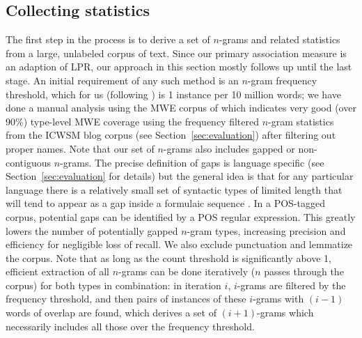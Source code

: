 \documentclass[11pt,letterpaper]{article}
\newcommand{\secref}[2][]{Section#1~\ref{#2}\xspace}
\begin{document}
\subsection{Collecting statistics}

The first step in the process is to derive a set of $n$-grams and related statistics from a large, unlabeled corpus of text. Since our primary association measure is an adaption of LPR, our approach in this section mostly follows  up until the last stage. An initial requirement of any such method is an $n$-gram frequency threshold, which for us (following ) is 1 instance per 10 million words; we have done a manual analysis using the MWE corpus of  which indicates very good (over 90\%) type-level MWE coverage using the frequency filtered $n$-gram statistics from the ICWSM blog corpus (see \secref{sec:evaluation}) after filtering out proper names. 
Note that our set of $n$-grams also includes gapped or non-contiguous $n$-grams. The precise definition of gaps is language specific (see \secref{sec:evaluation} for details) but the general idea is that for any particular language there is a relatively small set of syntactic types of limited length that will tend to appear as a gap inside a formulaic sequence \cite{Wasow:2002}.
In a POS-tagged corpus, potential gaps can be identified by a POS regular expression. This greatly lowers the number of potentially gapped $n$-gram types, increasing precision and efficiency for negligible loss of recall. We also exclude punctuation and lemmatize the corpus.  Note that as long as the count threshold is significantly above 1, efficient extraction of all $n$-grams can be done iteratively ($n$ passes through the corpus) for both types in combination: in iteration $i$, $i$-grams are filtered by the frequency threshold, and then pairs of instances of these $i$-grams with $(i-1)$ words of overlap are found, which derives a set of $(i+1)$-grams which necessarily includes all those over the frequency threshold. 
\end{document}
